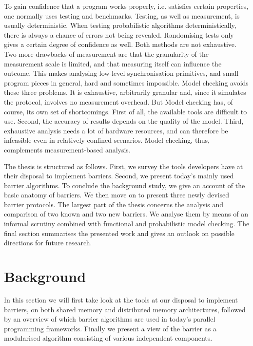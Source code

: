 \documentclass[a4paper, 10pt]{article}
\newcommand*\cleartooddpage{
	\clearpage
	\ifthenelse{\isodd{\thepage}}
		{}
		{\newpage \mbox{} \clearpage}
}
\begin{document}
To gain confidence that a program works properly, i.e. satisfies certain properties, one normally uses testing and benchmarks.
Testing, as well as measurement, is usually deterministic. When testing probabilistic algorithms deterministically, there is always a chance of errors not being revealed. Randomising tests only gives a certain degree of confidence as well. Both methods are not exhaustive.
Two more drawbacks of measurement are that the granularity of the measurement scale is limited, and that measuring itself can influence the outcome. This makes analysing low-level synchronisation primitives, and small program pieces in general, hard and sometimes impossible.
Model checking avoids these three problems. It is exhaustive, arbitrarily granular and, since it simulates the protocol, involves no measurement overhead. But Model checking has, of course, its own set of shortcomings. First of all, the available tools are difficult to use. Second, the accuracy of results depends on the quality of the model. Third, exhaustive analysis needs a lot of hardware resources, and can therefore be infeasible even in relatively confined scenarios.
Model checking, thus, complements measurement-based analysis.

The thesis is structured as follows. First, we survey the tools developers have at their disposal to implement barriers. Second, we present today's mainly used barrier algorithms. To conclude the background study, we give an account of the basic anatomy of barriers.
We then move on to present three newly devised barrier protocols.
The largest part of the thesis concerns the analysis and comparison of two known and two new barriers. We analyse them by means of an informal scrutiny combined with functional and probabilistic model checking.
The final section summarises the presented work and gives an outlook on possible directions for future research.

\cleartooddpage
\section{Background}
\label{sec:background}
In this section we will first take look at the tools at our disposal to implement barriers, on both shared memory and distributed memory architectures, followed by an overview of which barrier algorithms are used in today's parallel programming frameworks.
Finally we present a view of the barrier as a modularised algorithm consisting of various independent components.
\end{document}

